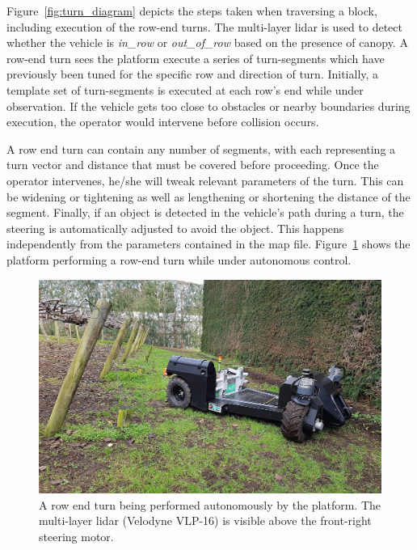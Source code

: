 \documentclass[preprint,authoryear,12pt]{elsarticle}
\begin{document}
    Figure~\ref{fig:turn_diagram} depicts the steps taken when traversing a block, including execution of the row-end turns.
    The multi-layer lidar is used to detect whether the vehicle is \textit{in\_row} or \textit{out\_of\_row} based on the presence of canopy.
    A row-end turn sees the platform execute a series of turn-segments which have previously been tuned for the specific row and direction of turn.
    Initially, a template set of turn-segments is executed at each row's end while under observation.
    If the vehicle gets too close to obstacles or nearby boundaries during execution, the operator would intervene before collision occurs.

    A row end turn can contain any number of segments, with each representing a turn vector and distance that must be covered before proceeding.
    Once the operator intervenes, he/she will tweak relevant parameters of the turn.
    This can be widening or tightening as well as lengthening or shortening the distance of the segment.
    Finally, if an object is detected in the vehicle's path during a turn, the steering is automatically adjusted to avoid the object.
    This happens independently from the parameters contained in the map file.
    Figure~\ref{fig:suzy_turning} shows the platform performing a row-end turn while under autonomous control.

    \begin{figure}[htb]
        \centering
        \includegraphics[width=\linewidth]{imgs/photos/suzy_turning.jpg}
        \caption{
            A row end turn being performed autonomously by the platform.
            The multi-layer lidar (Velodyne VLP-16) is visible above the front-right steering motor.
        }
        \label{fig:suzy_turning}
    \end{figure}
\end{document}
